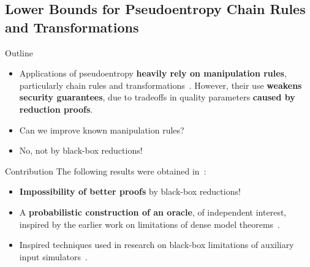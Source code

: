 \documentclass[9pt]{beamer}					%
\begin{document}
\subsection{Lower Bounds for Pseudoentropy Chain Rules and Transformations }

\begin{frame}{Outline}
\begin{itemize}
\item[\emoji{open-book}] Applications of pseudoentropy \textbf{heavily rely on manipulation rules}, particularly chain rules and transformations~\cite{DBLP:conf/random/BarakSW03,DBLP:conf/tcc/FullerOR12}. However, their use \textbf{weakens security guarantees}, due to tradeoffs in quality parameters \textbf{caused by reduction proofs}.
\item[\emoji{question}] Can we improve known manipulation rules?
\item[\emoji{raised-hand}] No, not by black-box reductions!
\end{itemize}
\end{frame}

\begin{frame}{Contribution}
The following results were obtained in~\cite{pietrzak2016pseudoentropy}:
\begin{itemize}
    \item[\emoji{key}] \textbf{Impossibility of better proofs} by black-box reductions!
    \item[\emoji{key}] A \textbf{probabilistic construction of an oracle}, of independent interest, inspired by the earlier work on limitations of dense model theorems~\cite{DBLP:journals/eccc/Zhang11}.
    \item[\emoji{fire}] Inspired techniques used in research on black-box limitations of auxiliary input simulators~\cite{Chen_2018}.
\end{itemize}
\end{frame}
\end{document}

